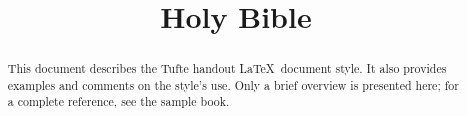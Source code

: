 



\title{Holy Bible}

\frontmatter

\begin{abstract}
\noindent This document describes the Tufte handout \LaTeX\ document style.
It also provides examples and comments on the style's use.  Only a brief
overview is presented here; for a complete reference, see the sample book.
\end{abstract}


\mainmatter




